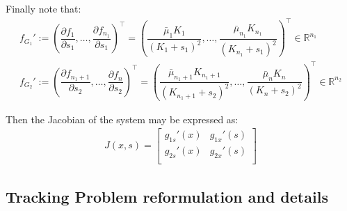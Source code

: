 \documentclass[3p,times]{article}
\newcommand{\R}{\mathbb{R}}
\begin{document}
Finally note that:
\begin{align*}
f_{G_1}' := \left( \dfrac{\partial f_1}{\partial s_1}, \dots, \dfrac{\partial f_{n_1}}{\partial s_1} \right)^\top = \left(\dfrac{\bar{\mu}_1K_1}{(K_1 + s_1)^2},\dots, \dfrac{\bar{\mu}_{n_1}K_{n_1}}{(K_{n_1} + s_1)^2} \right)^\top \in \R^{n_1} \\
f_{G_2}' := \left( \dfrac{\partial f_{n_1+1}}{\partial s_2}, \dots, \dfrac{\partial f_{n}}{\partial s_2} \right)^\top = \left( \dfrac{\bar{\mu}_{n_1+1}K_{n_1+1}}{(K_{n_1+1} + s_2)^2},\dots, \dfrac{\bar{\mu}_{n}K_{n}}{(K_{n} + s_2)^2} \right)^\top \in \R^{n_2}
\end{align*}

Then the Jacobian of the system may be expressed as:
\begin{align}
\label{Jacobian_system}
 J(x,s) = \begin{bmatrix}
g_{1s}'(x) & g_{1x}'(s) \\
g_{2s}'(x) & g_{2x}'(s) \\
\end{bmatrix} 
\end{align} 

\subsection{Tracking Problem reformulation and details}
\end{document}
